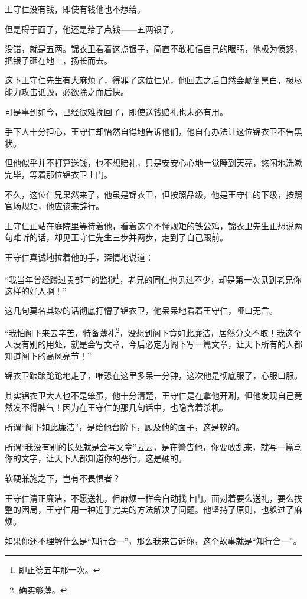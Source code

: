 \begin{multicols}{\theparacolNo}
		王守仁没有钱，即使有钱他也不想给。

		但是碍于面子，他还是给了点钱——五两银子。

		没错，就是五两。锦衣卫看着这点银子，简直不敢相信自己的眼睛，他极为愤怒，把银子砸在地上，扬长而去。

		这下王守仁先生有大麻烦了，得罪了这位仁兄，他回去之后自然会颠倒黑白，极尽能力攻击诋毁，必欲除之而后快。

		可是事到如今，已经很难挽回了，即使送钱赔礼也未必有用。

		手下人十分担心，王守仁却怡然自得地告诉他们，他自有办法让这位锦衣卫不告黑状。

		但他似乎并不打算送钱，也不想赔礼，只是安安心心地一觉睡到天亮，悠闲地洗漱完毕，等着那位锦衣卫上门。

		不久，这位仁兄果然来了，他虽是锦衣卫，但按照品级，他是王守仁的下级，按照官场规矩，他应该来辞行。

		王守仁正站在庭院里等待着他，看着这个不懂规矩的铁公鸡，锦衣卫先生正想说两句难听的话，却见王守仁先生三步并两步，走到了自己跟前。

		王守仁真诚地拉着他的手，深情地说道：

		“我当年曾经蹲过贵部门的监狱\footnote{即正德五年那一次。}，老兄的同仁也见过不少，却是第一次见到老兄你这样的好人啊！”

		这几句莫名其妙的话彻底打懵了锦衣卫，他呆呆地看着王守仁，哑口无言。

		“我怕阁下来去辛苦，特备薄礼\footnote{确实够薄。}，没想到阁下竟如此廉洁，居然分文不取！我这个人没有别的用处，就是会写文章，今后必定为阁下写一篇文章，让天下所有的人都知道阁下的高风亮节！”

		锦衣卫踉踉跄跄地走了，唯恐在这里多呆一分钟，这次他是彻底服了，心服口服。

		其实锦衣卫大人也不是笨蛋，他十分清楚，王守仁是在拿他开涮，但他发现自己竟然发不得脾气！因为在王守仁的那几句话中，也隐含着杀机。

		所谓“阁下如此廉洁”，是给他台阶下，顾及他的面子，这是软的。

		所谓“我没有别的长处就是会写文章”云云，是在警告他，你要敢乱来，就写一篇骂你的文字，让天下人都知道你的恶行。这是硬的。

		软硬兼施之下，岂有不畏惧者？

		王守仁清正廉洁，不愿送礼，但麻烦一样会自动找上门。面对着要么送礼，要么挨整的困局，王守仁用一种近乎完美的方法解决了问题。他坚持了原则，也躲过了麻烦。

		如果你还不理解什么是“知行合一”，那么我来告诉你，这个故事就是“知行合一”。


\end{multicols}
